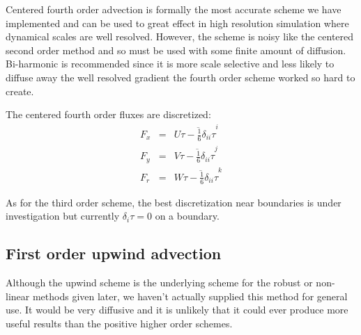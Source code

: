 Centered fourth order advection is formally the most accurate scheme
we have implemented and can be used to great effect in high resolution
simulation where dynamical scales are well resolved. However, the
scheme is noisy like the centered second order method and so must be
used with some finite amount of diffusion. Bi-harmonic is recommended
since it is more scale selective and less likely to diffuse away the
well resolved gradient the fourth order scheme worked so hard to
create.

The centered fourth order fluxes are discretized:
\begin{eqnarray}
F_x & = & U \overline{\tau - \frac{1}{6} \delta_{ii} \tau}^i \\
F_y & = & V \overline{\tau - \frac{1}{6} \delta_{ii} \tau}^j \\
F_r & = & W \overline{\tau - \frac{1}{6} \delta_{ii} \tau}^k
\end{eqnarray}

As for the third order scheme, the best discretization near boundaries
is under investigation but currently $\delta_i \tau=0$ on a boundary.



\subsection{First order upwind advection}

Although the upwind scheme is the underlying scheme for the robust or
non-linear methods given later, we haven't actually supplied this
method for general use. It would be very diffusive and it is unlikely
that it could ever produce more useful results than the positive
higher order schemes.

